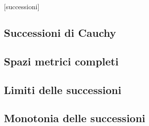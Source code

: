 [successioni]

\subsection{Successioni di Cauchy}



\subsection{Spazi metrici completi}



\subsection{Limiti delle successioni}



\subsection{Monotonia delle successioni}

